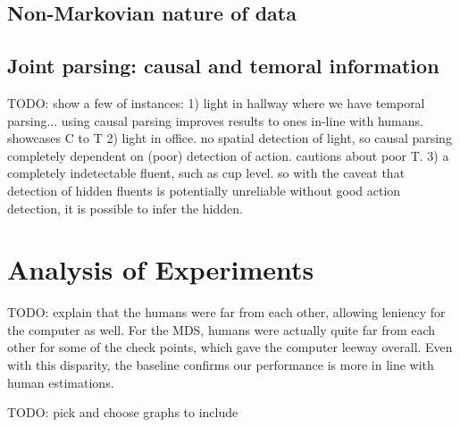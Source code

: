 \documentclass[10pt,journal,letterpaper,compsoc]{IEEEtran}
\begin{document}
\subsection{Non-Markovian nature of data}





\subsection{Joint parsing: causal and temoral information}


TODO: show a few of instances:  1) light in hallway where we have temporal parsing...  using causal parsing improves results to ones in-line with humans. showcases C to T  2) light in office.  no spatial detection of light, so causal parsing completely dependent on (poor) detection of action. cautions about poor T.  3) a completely indetectable fluent, such as cup level.  so with the caveat that detection of hidden fluents is potentially unreliable without good action detection, it is possible to infer the hidden.


\section{Analysis of Experiments}

TODO: explain that the humans were far from each other, allowing leniency for the computer as well.   For the MDS, humans were actually quite far from each other for some of the check points, which gave the computer leeway overall.  Even with this disparity, the baseline confirms our performance is more in line with human estimations.

TODO: pick and choose graphs to include
\end{document}
